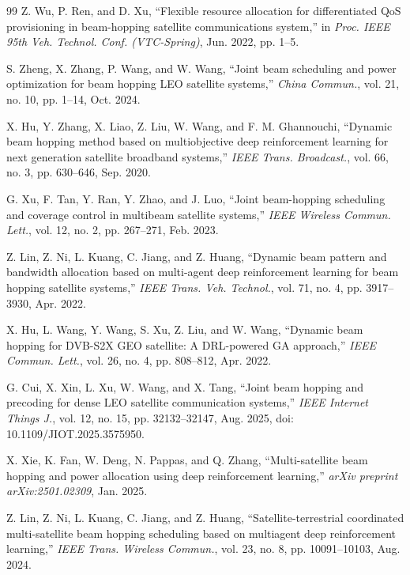 \documentclass[journal]{IEEEtran}
\newcommand{\revbegin}[1]{\color{revisionblue}\ignorespaces}
\newcommand{\revend}[1]{\color{black}\ignorespaces}
\begin{document}
\begin{thebibliography}{99}
 Z. Wu, P. Ren, and D. Xu, ``Flexible resource allocation for differentiated QoS provisioning in beam-hopping satellite communications system,'' in \textit{Proc. IEEE 95th Veh. Technol. Conf. (VTC-Spring)}, Jun. 2022, pp. 1--5.

 S. Zheng, X. Zhang, P. Wang, and W. Wang, ``Joint beam scheduling and power optimization for beam hopping LEO satellite systems,'' \textit{China Commun.}, vol. 21, no. 10, pp. 1--14, Oct. 2024.

 X. Hu, Y. Zhang, X. Liao, Z. Liu, W. Wang, and F. M. Ghannouchi, ``Dynamic beam hopping method based on multiobjective deep reinforcement learning for next generation satellite broadband systems,'' \textit{IEEE Trans. Broadcast.}, vol. 66, no. 3, pp. 630--646, Sep. 2020.

 G. Xu, F. Tan, Y. Ran, Y. Zhao, and J. Luo, ``Joint beam-hopping scheduling and coverage control in multibeam satellite systems,'' \textit{IEEE Wireless Commun. Lett.}, vol. 12, no. 2, pp. 267--271, Feb. 2023.

 Z. Lin, Z. Ni, L. Kuang, C. Jiang, and Z. Huang, ``Dynamic beam pattern and bandwidth allocation based on multi-agent deep reinforcement learning for beam hopping satellite systems,'' \textit{IEEE Trans. Veh. Technol.}, vol. 71, no. 4, pp. 3917--3930, Apr. 2022.

 X. Hu, L. Wang, Y. Wang, S. Xu, Z. Liu, and W. Wang, ``Dynamic beam hopping for DVB-S2X GEO satellite: A DRL-powered GA approach,'' \textit{IEEE Commun. Lett.}, vol. 26, no. 4, pp. 808--812, Apr. 2022.

\revbegin{} G. Cui, X. Xin, L. Xu, W. Wang, and X. Tang, ``Joint beam hopping and precoding for dense LEO satellite communication systems,'' \textit{IEEE Internet Things J.}, vol. 12, no. 15, pp. 32132--32147, Aug. 2025, doi: 10.1109/JIOT.2025.3575950.\revend{}

 X. Xie, K. Fan, W. Deng, N. Pappas, and Q. Zhang, ``Multi-satellite beam hopping and power allocation using deep reinforcement learning,'' \textit{arXiv preprint arXiv:2501.02309}, Jan. 2025.

 Z. Lin, Z. Ni, L. Kuang, C. Jiang, and Z. Huang, ``Satellite-terrestrial coordinated multi-satellite beam hopping scheduling based on multiagent deep reinforcement learning,'' \textit{IEEE Trans. Wireless Commun.}, vol. 23, no. 8, pp. 10091--10103, Aug. 2024.


\end{thebibliography}
\end{document}
